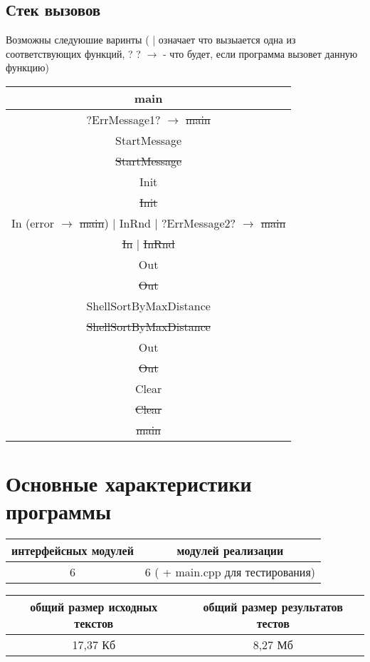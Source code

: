 \documentclass[a4paper]{article}
\begin{document}
\subsection*{Стек вызовов}
Возможны следуюшие варинты ( | означает что вызыается одна из соответствующих функций, ? ? $\rightarrow$ - что будет, если программа вызовет данную функцию)
\\
\begin{tabular}{ ||c|| }
    \hline
    main\\
    \hline
    ?ErrMessage1? $\rightarrow$ \sout{main}\\
    \hline
    StartMessage\\
    \hline
    \sout{StartMessage}\\
    \hline
    Init\\
    \hline
    \sout{Init}\\
    \hline
    In (error $\rightarrow$ \sout{main}) | InRnd | ?ErrMessage2? $\rightarrow$ \sout{main}\\
    \hline
    \sout{In} | \sout{InRnd}\\
    \hline
    Out\\
    \hline
    \sout{Out}\\
    \hline
    ShellSortByMaxDistance\\
    \hline
    \sout{ShellSortByMaxDistance}\\
    \hline
    Out\\
    \hline
    \sout{Out}\\
    \hline
    Clear\\
    \hline
    \sout{Clear}\\
    \hline
    \sout{main}\\
    \hline
\end{tabular}

\newpage
\section*{Основные характеристики программы}

\begin{tabular}{ |c|c| }   
    \hline   
    интерфейсных модулей & модулей реализации\\
    \hline
    6 & 6 ( + main.cpp для тестирования)\\    
    \hline
\end{tabular}


\begin{tabular}{ |c|c| }   
    \hline   
    общий размер исходных текстов & общий размер результатов тестов\\
    \hline
    17,37 Кб & 8,27 Мб\\
    \hline
\end{tabular}
\end{document}
